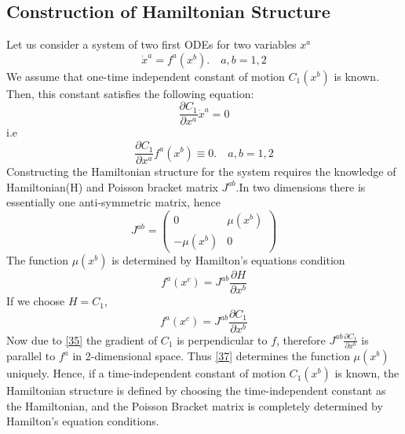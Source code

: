 \documentclass[12pt]{article}
\begin{document}
\subsection{Construction of Hamiltonian Structure}\label{App-1}
Let us consider a system of two first ODEs for two variables $x^{a}$ 
\begin{equation}
\dot{x}^{a}=f^{a}\left(x^{b}\right) . \quad a, b=1,2
\end{equation}
We assume that one-time independent constant of motion $C_{1}(x^{b})$ is known. Then, this constant satisfies the following equation:
\begin{equation}
\frac{\partial C_{1}}{\partial x^{a}}\dot{x}^{a}=0
\end{equation}
i.e
\begin{equation}
\frac{\partial C_{1}}{\partial x^{a}} f^{a}\left(x^{b}\right) \equiv 0 . \quad a, b=1,2
\end{equation}
Constructing the Hamiltonian structure for the system requires the knowledge of Hamiltonian(H) and Poisson bracket matrix $J^{a b}$.In two dimensions there is essentially one anti-symmetric matrix, hence
\begin{equation}
J^{a b}=\left( \begin{array}{cc}{0} & {\mu\left(x^{b}\right)} \\ {-\mu\left(x^{b}\right)} & {0}\end{array}\right)
\end{equation}
The function $\mu(x^{b})$ is determined by Hamilton's equations condition
\begin{equation*}
f^{a}\left(x^{c}\right)=J^{a b} \frac{\partial H}{\partial x^{b}}
\end{equation*}
If we choose $H=C_{1}$,
\begin{equation}
f^{a}\left(x^{c}\right)=J^{a b} \frac{\partial C_{1}}{\partial x^{b}}
\end{equation}
Now due to \eqref{35} the gradient of $C_{1}$ is perpendicular to $f$, therefore 
$J^{a b} \frac{\partial C_{1}}{\partial x^{b}}$ is parallel to $f^{a}$ in 2-dimensional space. Thus \eqref{37} determines the function $\mu(x^{b})$ uniquely. Hence, if a time-independent constant of motion $C_{1}(x^{b})$ is known, the Hamiltonian structure is defined by choosing the time-independent constant as the Hamiltonian, and the Poisson Bracket matrix is completely determined by Hamilton's equation conditions.
\end{document}

